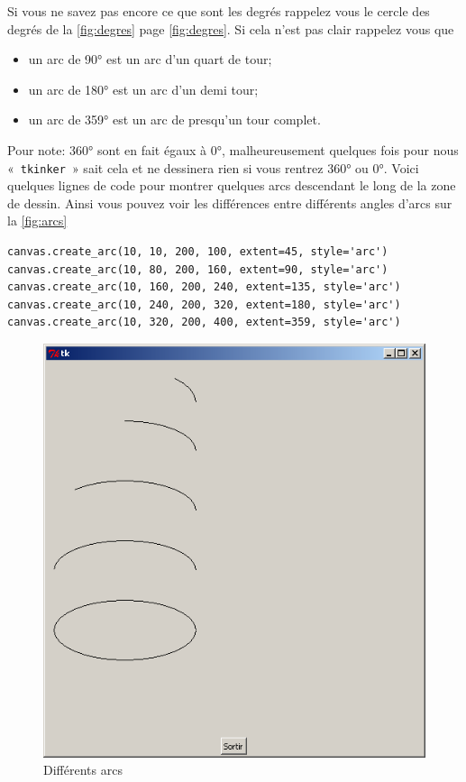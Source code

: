 Si vous ne savez pas encore ce que sont les degrés rappelez vous le cercle des degrés de la \autoref{fig:degres} page \autoref{fig:degres}. Si cela n'est pas clair rappelez vous que
\begin{itemize}
\item un arc de 90° est un arc d'un quart de tour;
\item un arc de 180° est un arc d'un demi tour;
\item un arc de 359° est un arc de presqu'un tour complet.
\end{itemize}

Pour note: 360° sont en fait égaux à 0°, malheureusement quelques fois pour nous «~\texttt{tkinker}~» sait cela et ne dessinera rien si vous rentrez 360° ou 0°. Voici quelques lignes de code pour montrer quelques arcs descendant le long de la zone de dessin. Ainsi vous pouvez voir les différences entre différents angles d'arcs sur la \autoref{fig:arcs}
\begin{Verbatim}[frame=single,rulecolor=\color{mbleu}, label=à taper]
canvas.create_arc(10, 10, 200, 100, extent=45, style='arc')
canvas.create_arc(10, 80, 200, 160, extent=90, style='arc')
canvas.create_arc(10, 160, 200, 240, extent=135, style='arc')
canvas.create_arc(10, 240, 200, 320, extent=180, style='arc')
canvas.create_arc(10, 320, 200, 400, extent=359, style='arc')
\end{Verbatim}

\begin{figure}[h!]
\centering
\includegraphics[scale=0.4]{images/arcs}
\caption{Différents arcs}\label{fig:arcs}
\end{figure}


